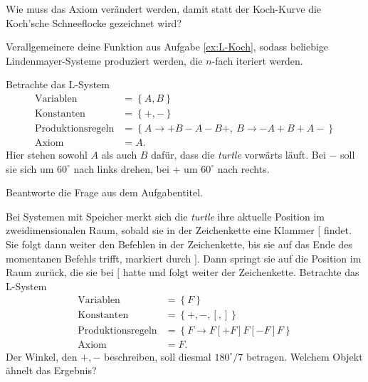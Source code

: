     Wie muss das Axiom ver\"andert werden, damit statt der Koch-Kurve
    die Koch'sche Schneeflocke gezeichnet wird?

\subexercise[
    topic = Allgemeine L-Systeme
]
\label{ex:L-allg}
Verallgemeinere deine Funktion aus Aufgabe \ref{ex:L-Koch}, sodass beliebige
Lindenmayer-Systeme produziert werden, die $n$-fach iteriert werden.

\exercise[
    topic = Was ist das f\"ur 1 Fraktal?
]
Betrachte das L-System
\begin{subequations}
    \label{eq:Sierpinski-L}
\begin{align}
    \mathrm{Variablen} &= \left\{A,B\right\} \\
    \mathrm{Konstanten} &= \left\{+,-\right\} \\
    \mathrm{Produktionsregeln} &= \left\{A\rightarrow +B-A-B+,\
        B\rightarrow -A+B+A-\right\} \\
    \mathrm{Axiom} &= A.
\end{align}
\end{subequations}
Hier stehen sowohl $A$ als auch $B$ daf\"ur, dass die \emph{turtle}
vorw\"arts l\"auft. Bei $-$ soll sie sich um $60^\circ$ nach links
drehen, bei $+$ um $60^\circ$ nach rechts.

Beantworte die Frage aus dem Aufgabentitel.

\subexercise[  
topic = L-Systeme mit Speicher
]
Bei Systemen mit Speicher merkt sich die \emph{turtle} ihre aktuelle
Position im zweidimensionalen Raum, sobald sie in der Zeichenkette eine Klammer $[$ findet. Sie
folgt dann weiter den Befehlen in der Zeichenkette, bis sie auf das Ende
des momentanen Befehls trifft, markiert durch $]$. Dann springt sie auf
die Position im Raum zur\"uck, die sie bei $[$ hatte und folgt weiter
der Zeichenkette. Betrachte das L-System
\begin{subequations}
    \label{eq:Farn-L}
\begin{align}
    \mathrm{Variablen} &= \left\{F\right\} \\
    \mathrm{Konstanten} &= \left\{+,-,[,]\right\} \\
    \mathrm{Produktionsregeln} &= \left\{ F \rightarrow
        F[+F]F[-F]F\right\}\\
\mathrm{Axiom} &= F.
\end{align}
\end{subequations}
Der Winkel, den $+,-$ beschreiben, soll diesmal $180^\circ/7$ betragen.
Welchem Objekt \"ahnelt das Ergebnis?
